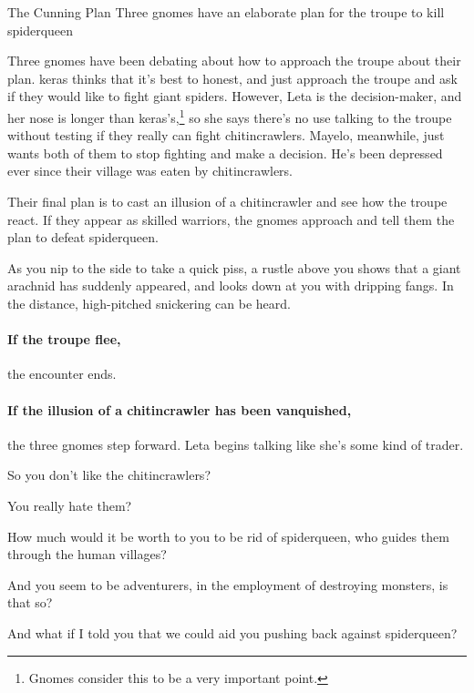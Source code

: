 {The Cunning Plan}%
{Three gnomes have an elaborate plan for the troupe to kill \gls{spiderqueen}}%

\begin{exampletext}
  Three gnomes have been debating about how to approach the troupe about their plan.
  \Gls{keras} thinks that it's best to honest, and just approach the troupe and ask if they would like to fight giant spiders.
  However, Leta is the decision-maker, and her nose is longer than \gls{keras}'s,\footnote{Gnomes consider this to be a very important point.} so she says there's no use talking to the troupe without testing if they really can fight chitincrawlers.
  Mayelo, meanwhile, just wants both of them to stop fighting and make a decision.
  He's been depressed ever since their village was eaten by chitincrawlers.

  Their final plan is to cast an illusion of a chitincrawler and see how the troupe react.
  If they appear as skilled warriors, the gnomes approach and tell them the plan to defeat \gls{spiderqueen}.
\end{exampletext}

\begin{boxtext}

  As you nip to the side to take a quick piss, a rustle above you shows that a giant arachnid has suddenly appeared, and looks down at you with dripping fangs.
  In the distance, high-pitched snickering can be heard.

\end{boxtext}

\paragraph{If the troupe flee,}
the encounter ends.

\paragraph{If the illusion of a chitincrawler has been vanquished,}
the three gnomes step forward.
Leta begins talking like she's some kind of trader.

\begin{speechtext}

  So you don't like the chitincrawlers?

  You really hate them?

  How much would it be worth to you to be rid of \gls{spiderqueen}, who guides them through the human \glspl{village}?

  And you seem to be adventurers, in the employment of destroying monsters, is that so?

  And what if I told you that we could aid you pushing back against \gls{spiderqueen}?

\end{speechtext}

